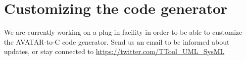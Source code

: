 \documentclass[12pt]{article}
\begin{document}
\newpage
\section{Customizing the code generator}\label{sec:customgenerator}
We are currently working on a plug-in facility in order to be able to customize the AVATAR-to-C code generator. Send us an email to be informed about updates, or stay connected to \url{https://twitter.com/TTool_UML_SysML}
\end{document}
